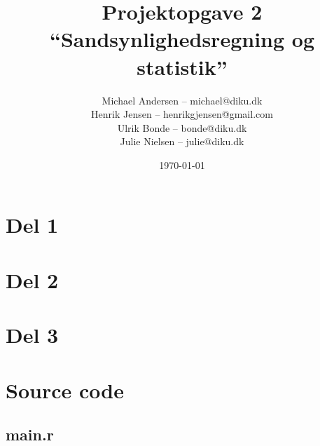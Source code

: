 \documentclass[a4paper, 10pt, final]{article}
\title{Projektopgave 2\\ ``Sandsynlighedsregning og statistik''}
\author{Michael Andersen -- michael@diku.dk \\ Henrik Jensen --
        henrikgjensen@gmail.com \\ Ulrik Bonde -- bonde@diku.dk \\
        Julie Nielsen -- julie@diku.dk}
\date{\today}
\begin{document}
\maketitle
\thispagestyle{empty}

\section*{Del 1}


\section*{Del 2}


\section*{Del 3}


\newpage

\appendix

\section{Source code}
\subsection{main.r \label{app_source1}}

\end{document}
